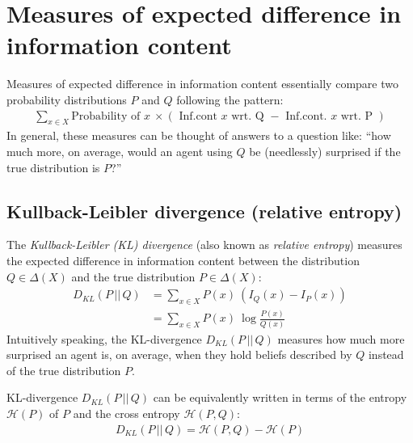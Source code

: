 \documentclass[nobib,nofonts]{tufte-handout}
\begin{document}
\section{Measures of expected difference in information content }
\label{sec:meas-expect-diff}

Measures of expected difference in information content essentially compare two probability distributions $P$ and $Q$ following the pattern:
\begin{align*}
  \sum_{x \in X} \text{Probability of } x \ \times (\text{ Inf.cont } x \text{ wrt. Q } - \text{ Inf.cont. } x \text{ wrt. P })
\end{align*}
In general, these measures can be thought of answers to a question like: ``how much more, on average, would an agent using $Q$ be (needlessly) surprised if the true distribution is $P$?''

\subsection{Kullback-Leibler divergence (relative entropy)}

The \emph{Kullback-Leibler (KL) divergence} (also known as \emph{relative entropy}) measures the expected difference in information content between the distribution $Q \in \Delta(X)$ and the true distribution $P \in \Delta(X)$:
\begin{align*}
  D_{KL}(P \,||\, Q) & = \sum_{x \in X} P(x) \ \left ( I_{Q}(x) - I_{P}(x) \right ) \\
  & = \sum_{x \in X} P(x) \ \log  \frac{P(x)}{Q(x)}
\end{align*}
Intuitively speaking, the KL-divergence $D_{KL}(P \,||\, Q)$ measures how much more surprised an agent is, on average, when they hold beliefs described by $Q$ instead of the true distribution $P$.

KL-divergence $D_{KL}(P \,||\, Q)$ can be equivalently written in terms of the entropy $\mathcal{H}(P)$ of $P$ and the cross entropy $\mathcal{H}(P,Q)$:
\begin{align*}
  D_{KL}(P \,||\, Q) = \mathcal{H}(P,Q) - \mathcal{H}(P)
\end{align*}
\end{document}

